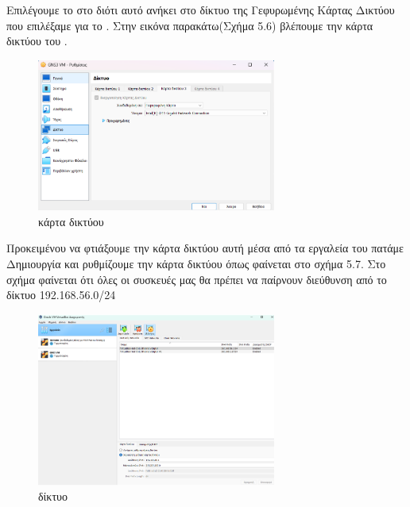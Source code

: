 Επιλέγουμε το  στο  διότι αυτό ανήκει στο δίκτυο της Γεφυρωμένης Κάρτας Δικτύου που επιλέξαμε για το . Στην εικόνα παρακάτω(Σχήμα 5.6) βλέπουμε την κάρτα δικτύου του .

\FloatBarrier

\begin{figure}[htb]
	\centering
	\includegraphics[width=0.7\textwidth]{graphics/GNS3_network_adapter.png}
	\caption{ κάρτα δικτύου }
\end{figure}

\FloatBarrier

\noindent Προκειμένου να φτιάξουμε την κάρτα δικτύου αυτή μέσα από τα εργαλεία του  πατάμε Δημιουργία 
και ρυθμίζουμε την κάρτα δικτύου όπως φαίνεται στο σχήμα 5.7. Στο σχήμα φαίνεται ότι όλες οι συσκευές μας θα πρέπει να παίρνουν  διεύθυνση από το δίκτυο 192.168.56.0/24


\FloatBarrier

\begin{figure}[htb]
	\centering
	\includegraphics[width=0.7\textwidth]{graphics/GNS3_Network.png}
	\caption{ δίκτυο }
\end{figure}

\FloatBarrier


